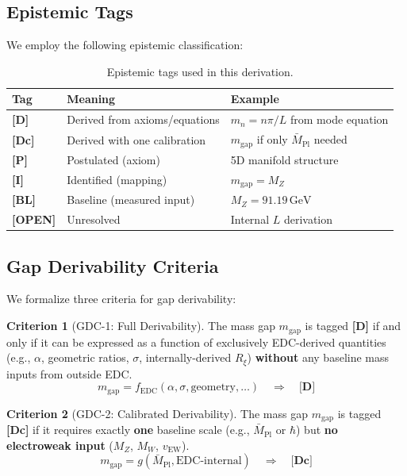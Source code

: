 \documentclass[11pt,a4paper]{article}
\newcommand{\Mpl}{\bar{M}_{\mathrm{Pl}}}
\newcommand{\Rxi}{R_\xi}
\newcommand{\mgap}{m_{\mathrm{gap}}}
\newcommand{\MZ}{M_Z}
\newcommand{\GeV}{\,\mathrm{GeV}}
\newcommand{\tagD}{\textbf{[D]}}
\newcommand{\tagDc}{\textbf{[Dc]}}
\newcommand{\tagI}{\textbf{[I]}}
\newcommand{\tagBL}{\textbf{[BL]}}
\newcommand{\tagP}{\textbf{[P]}}
\newcommand{\tagOPEN}{\textbf{[OPEN]}}
\theoremstyle{definition}
\newtheorem{criterion}{Criterion}[section]
\theoremstyle{plain}
\theoremstyle{remark}
\begin{document}
\subsection{Epistemic Tags}

We employ the following epistemic classification:

\begin{table}[htbp]
\centering
\caption{Epistemic tags used in this derivation.}
\label{tab:tags}
\begin{tabular}{@{}lll@{}}
\toprule
Tag & Meaning & Example \\
\midrule
\tagD{} & Derived from axioms/equations & $m_n = n\pi/L$ from mode equation \\
\tagDc{} & Derived with one calibration & $\mgap$ if only $\Mpl$ needed \\
\tagP{} & Postulated (axiom) & 5D manifold structure \\
\tagI{} & Identified (mapping) & $\mgap = \MZ$ \\
\tagBL{} & Baseline (measured input) & $\MZ = 91.19\GeV$ \\
\tagOPEN{} & Unresolved & Internal $L$ derivation \\
\bottomrule
\end{tabular}
\end{table}

\subsection{Gap Derivability Criteria}

We formalize three criteria for gap derivability:

\begin{criterion}[GDC-1: Full Derivability]
\label{crit:gdc1}
The mass gap $\mgap$ is tagged \tagD{} if and only if it can be expressed as a function
of exclusively EDC-derived quantities (e.g., $\alpha$, geometric ratios, $\sigma$,
internally-derived $\Rxi$) \textbf{without} any baseline mass inputs from outside EDC.
\begin{equation}
\boxed{\mgap = f_{\mathrm{EDC}}(\alpha, \sigma, \text{geometry}, \ldots) \quad \Rightarrow \quad \tagD{}}
\label{eq:gdc1}
\end{equation}
\end{criterion}

\begin{criterion}[GDC-2: Calibrated Derivability]
\label{crit:gdc2}
The mass gap $\mgap$ is tagged \tagDc{} if it requires exactly \textbf{one} baseline
scale (e.g., $\Mpl$ or $\hbar$) but \textbf{no electroweak input} ($\MZ$, $M_W$, $v_{\mathrm{EW}}$).
\begin{equation}
\boxed{\mgap = g(\Mpl, \text{EDC-internal}) \quad \Rightarrow \quad \tagDc{}}
\label{eq:gdc2}
\end{equation}
\end{criterion}
\end{document}
